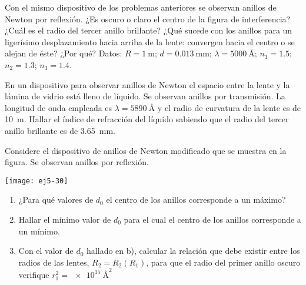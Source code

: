 \item Con el mismo dispositivo de los problemas anteriores se observan anillos de Newton por reflexión.
¿Es oscuro o claro el centro de la figura de interferencia?
¿Cuál es el radio del tercer anillo brillante?
¿Qué sucede con los anillos para un ligerísimo desplazamiento hacia arriba de la lente: convergen hacia el centro o se alejan de éste?
¿Por qué? 
Datos: $R = \SI{1}{\metre}$; $d = \SI{0.013}{\milli\metre}$; $\lambda = \SI{5000}{\angstrom}$; $n_1 = \num{1.5}$; $n_2 = \num{1.3}$; $n_3 = \num{1.4}$.



\item En un dispositivo para observar anillos de Newton el espacio entre la lente y la lámina de vidrio está lleno de líquido.
Se observan anillos por transmisión.
La longitud de onda empleada es $\lambda = \SI{5890}{\angstrom}$ y el radio de curvatura de la lente es de \SI{10}{\metre}.
Hallar el índice de refracción del líquido sabiendo que el radio del tercer anillo brillante es de \SI{3.65}{\milli\metre}.



\item
\begin{minipage}[t][0cm]{0.7\textwidth}
Considere el dispositivo de anillos de Newton modificado que se muestra en la figura.
Se observan anillos por reflexión. 
\end{minipage}
\begin{minipage}[c][1.5cm][t]{0.25\textwidth}
	\texttt{[image: ej5-30]}
\end{minipage}
\begin{enumerate}
	\item ¿Para qué valores de $d_0$ el centro de los anillos corresponde a un máximo? 
	\item Hallar el mínimo valor de $d_0$ para el cual el centro de los anillos corresponde a un mínimo. 
	\item Con el valor de $d_0$ hallado en b), calcular la relación que debe existir entre los radios de las lentes, $R_2 = R_2(R_1)$, para que el radio del primer anillo oscuro verifique $r_1^2 = \SI{e+15}{\angstrom\squared}$
\end{enumerate}
